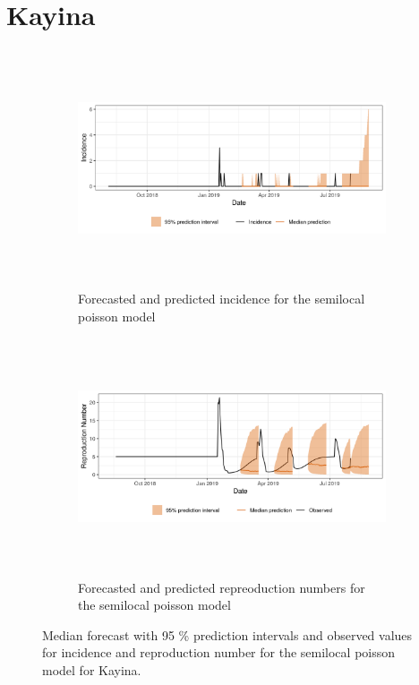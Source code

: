  \section{ Kayina }\begin{figure}[H]\begin{subfigure}{\textwidth}  \centering  \includegraphics[width=0.9\linewidth, height=7cm]{../output/Kayina_predictions.png}  \caption{Forecasted and predicted incidence for the semilocal poisson model}\end{subfigure}

\begin{subfigure}{\textwidth}  \centering  \includegraphics[width=0.9\linewidth, height=7cm]{../output/Kayina_Rs.png}  \caption{Forecasted and predicted repreoduction numbers for the semilocal poisson model}\end{subfigure}  \caption{Median forecast with 95 \% prediction intervals and observed values for incidence and reproduction number for the semilocal poisson model for Kayina.}\end{figure}

